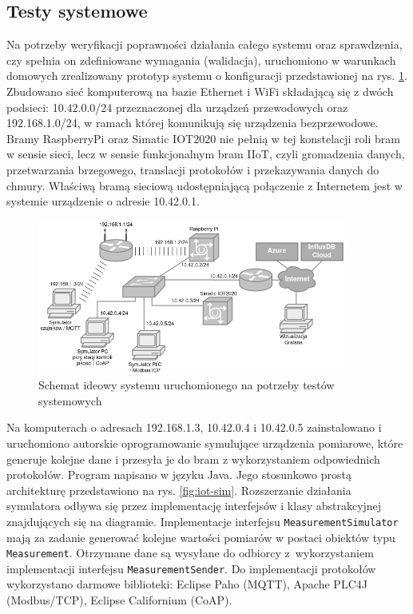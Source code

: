 \documentclass[a4paper, 12pt, twoside]{article}
\begin{document}
\subsection{Testy systemowe}\label{testy-systemowe}

Na potrzeby weryfikacji poprawności działania całego systemu oraz sprawdzenia,
czy spełnia on zdefiniowane wymagania (walidacja), uruchomiono w warunkach
domowych zrealizowany prototyp systemu o konfiguracji przedstawionej na rys. \ref{fig:network}.
Zbudowano sieć komputerową na bazie Ethernet i WiFi składającą się z dwóch
podsieci: 10.42.0.0/24 przeznaczonej dla urządzeń przewodowych oraz
192.168.1.0/24, w ramach której komunikują się urządzenia bezprzewodowe.
Bramy RaspberryPi oraz Simatic IOT2020 nie pełnią w tej konstelacji roli
bram w sensie sieci, lecz w sensie funkcjonalnym bram IIoT, czyli gromadzenia danych, przetwarzania
brzegowego, translacji protokołów i przekazywania danych do chmury.
Właściwą bramą sieciową udostępniającą połączenie z Internetem jest w systemie urządzenie o adresie 10.42.0.1.

\begin{figure}[h]
      \centering
      \includegraphics[width=0.9\textwidth]{network.png}
      \caption{Schemat ideowy systemu uruchomionego na potrzeby testów systemowych}
      \label{fig:network}
\end{figure}

Na komputerach o adresach 192.168.1.3, 10.42.0.4 i 10.42.0.5 zainstalowano i uruchomiono
autorskie oprogramowanie symulujące urządzenia pomiarowe, które generuje kolejne dane
i przesyła je do bram z wykorzystaniem odpowiednich protokołów. Program napisano
w języku Java. Jego stosunkowo prostą architekturę przedstawiono na rys. \ref{fig:iot-sim}.
Rozszerzanie działania symulatora odbywa się przez implementację interfejsów
i klasy abstrakcyjnej znajdujących się na diagramie. Implementacje interfejsu \texttt{MeasurementSimulator}
mają za zadanie generować kolejne wartości pomiarów w postaci obiektów typu
\texttt{Measurement}. Otrzymane dane są wysyłane do odbiorcy z~wykorzystaniem implementacji
interfejsu \texttt{MeasurementSender}. Do implementacji protokołów wykorzystano
darmowe biblioteki: Eclipse Paho (MQTT), Apache PLC4J (Modbus/TCP), Eclipse Californium (CoAP).
\end{document}
